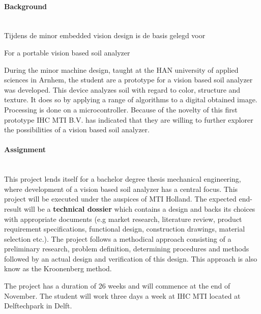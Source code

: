 \documentclass[a4paper,11pt]{../LatexDocStructures/MTItexMemo} %
\begin{document}
\maketitle %

\paragraph{Background}\mbox{} \\
Tijdens de minor embedded vision design is de basis gelegd voor 

For a portable vision based soil analyzer 

During the minor machine design, taught at the HAN university of applied sciences in Arnhem, the student are 
a prototype for a vision based soil analyzer was developed. This device analyzes soil with regard to color, structure and texture. It does so by applying a range of algorithms to a digital obtained image. Processing is done on a microcontroller. Because of the novelty of this first prototype IHC MTI B.V. has indicated that they are willing to further explorer the possibilities of a vision based soil analyzer.

\paragraph{Assignment}\mbox{} \\
This project lends itself for a bachelor degree thesis mechanical engineering, where development of a vision based soil analyzer has a central focus. This project will be executed under the auspices of MTI Holland. The expected end-result will be a \textbf{technical dossier} which contains a design and backs its choices with appropriate documents (e.g market research, literature review, product requirement specifications, functional design, construction drawings, material selection etc.). The project follows a methodical approach consisting of a preliminary research, problem definition, determining procedures and methods followed by an actual design and verification of this design. This approach is also know as the Kroonenberg method.

The project has a duration of 26 weeks and will commence at the end of November. The student will work three days a week at IHC MTI located at Delftechpark in Delft.
\end{document}

